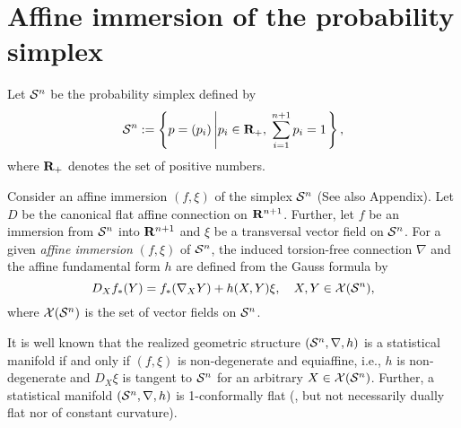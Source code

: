 \documentclass{llncs}
\begin{document}


%

\section{Affine immersion of the probability simplex}
Let ${\cal S}^n$ be the probability simplex defined by
\[
	{\cal S}^n :=\left\{p=(p_i) \left| 
		p_i \in {\bf R}_+, \; \sum_{i=1}^{n+1} p_i =1 \right.  \right\},
\]
where ${\bf R}_+$ denotes the set of positive numbers.

Consider an affine immersion \cite{NS}
$(f, \xi)$ of the simplex ${\cal S}^n$ (See also Appendix).
Let $D$ be the canonical flat affine connection on ${\bf R}^{n+1}$.
Further, let 
$f$ be an immersion from ${\cal S}^n$ into ${\bf R}^{n+1}$ and 
$\xi$ be a transversal vector field on ${\cal S}^n$.
For a given {\em affine immersion} $(f, \xi)$ of ${\cal S}^n$,
the induced torsion-free connection $\nabla$ 
and the affine fundamental form $h$ 
are defined from the Gauss formula by
\begin{equation}
	D_X f_*(Y)= f_*(\nabla_X Y)+h(X,Y)\xi,
		\quad X,Y \in {\cal X}({\cal S}^n),
\end{equation}
where ${\cal X}({\cal S}^n)$ is the set of vector fields on ${\cal S}^n$.

It is well known \cite{Kurose94,NS} that the realized geometric structure 
$({\cal S}^n,\nabla,h)$ is a statistical manifold if and only if 
$(f, \xi)$ is non-degenerate and equiaffine, i.e., 
$h$ is non-degenerate and $D_X \xi$ is tangent to ${\cal S}^n$ for an 
arbitrary $X \in {\cal X}({\cal S}^n)$.
Further, a statistical manifold $({\cal S}^n,\nabla,h)$ is 1-conformally flat 
\cite{Kurose94} 
(, but not necessarily dually flat nor of constant curvature).
\end{document}
